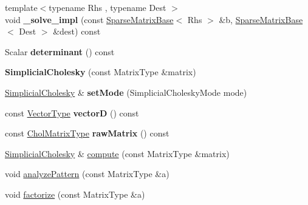 \begin{DoxyCompactItemize}
\item 
\mbox{\label{group___sparse_cholesky___module_a7e151cd125308b335949babf791fe6e6}} 
{\footnotesize template$<$typename Rhs , typename Dest $>$ }\\void {\bfseries \+\_\+solve\+\_\+impl} (const \hyperlink{group___sparse_core___module_class_eigen_1_1_sparse_matrix_base}{Sparse\+Matrix\+Base}$<$ Rhs $>$ \&b, \hyperlink{group___sparse_core___module_class_eigen_1_1_sparse_matrix_base}{Sparse\+Matrix\+Base}$<$ Dest $>$ \&dest) const
\item 
\mbox{\label{group___sparse_cholesky___module_a2cffa2384b8290de34b5a294d4383e70}} 
Scalar {\bfseries determinant} () const
\item 
\mbox{\label{group___sparse_cholesky___module_a334b3ee515c49a9930bb7f0785cb4fc2}} 
{\bfseries Simplicial\+Cholesky} (const Matrix\+Type \&matrix)
\item 
\mbox{\label{group___sparse_cholesky___module_a25e1d2336ca9c7ae5b3a723bea67ab42}} 
\hyperlink{group___sparse_cholesky___module_class_eigen_1_1_simplicial_cholesky}{Simplicial\+Cholesky} \& {\bfseries set\+Mode} (Simplicial\+Cholesky\+Mode mode)
\item 
\mbox{\label{group___sparse_cholesky___module_ae843051eff656868e8dc878ba6489603}} 
const \hyperlink{group___core___module}{Vector\+Type} {\bfseries vectorD} () const
\item 
\mbox{\label{group___sparse_cholesky___module_a9b1509da967218cf463ae8793445868d}} 
const \hyperlink{group___sparse_core___module}{Chol\+Matrix\+Type} {\bfseries raw\+Matrix} () const
\item 
\hyperlink{group___sparse_cholesky___module_class_eigen_1_1_simplicial_cholesky}{Simplicial\+Cholesky} \& \hyperlink{group___sparse_cholesky___module_a7883b49a88b26162ba6d8b044e2ee75b}{compute} (const Matrix\+Type \&matrix)
\item 
void \hyperlink{group___sparse_cholesky___module_a6af3f64b855a96a2635302f863b5fd91}{analyze\+Pattern} (const Matrix\+Type \&a)
\item 
void \hyperlink{group___sparse_cholesky___module_ab1b21d430cc2a8e332221313a4f2f2e3}{factorize} (const Matrix\+Type \&a)

\end{DoxyCompactItemize}
